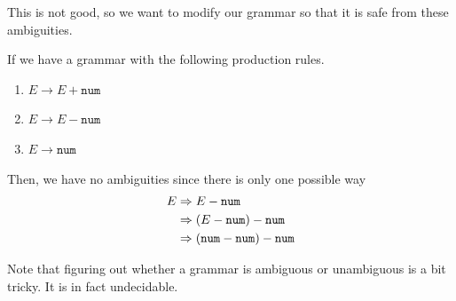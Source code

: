  This is not good, so we want to modify our grammar so that it is safe from these ambiguities. 

  \begin{example}
    \label{ex:non-ambiguous-context-free-grammar}
    If we have a grammar with the following production rules. 
    \begin{enumerate}
      \item $E \to E + \texttt{num}$
      \item $E \to E - \texttt{num}$ 
      \item $E \to \texttt{num}$
    \end{enumerate}
    Then, we have no ambiguities since there is only one possible way 
    \begin{align}
      E & \Rightarrow E - \texttt{num} \\ 
        & \Rightarrow (E - \texttt{num}) - \texttt{num} \\
        & \Rightarrow (\texttt{num} - \texttt{num}) - \texttt{num} 
    \end{align}
  \end{example}

  Note that figuring out whether a grammar is ambiguous or unambiguous is a bit tricky. It is in fact undecidable. 

